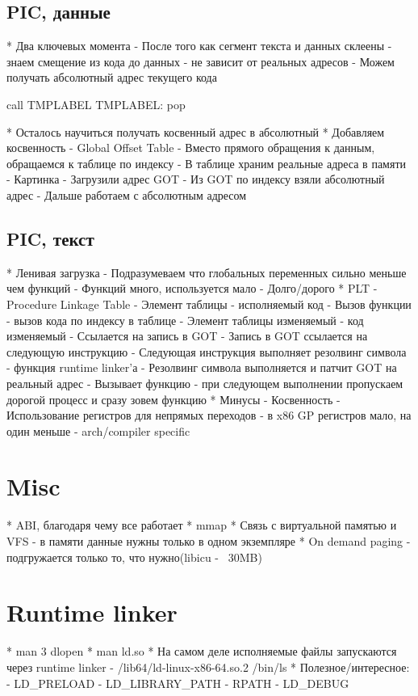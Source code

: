 \documentclass[../../lectures.tex]{subfiles}
\begin{document}
\subsection{PIC, данные}
  * Два ключевых момента
    - После того как сегмент текста и данных склеены - знаем смещение из кода до данных - не зависит от реальных адресов
    - Можем получать абсолютный адрес текущего кода

    call TMPLABEL
    TMPLABEL:
      pop %

  * Осталось научиться получать косвенный адрес в абсолютный
  * Добавляем косвенность - Global Offset Table
    - Вместо прямого обращения к данным, обращаемся к таблице по индексу
    - В таблице храним реальные адреса в памяти
    - Картинка
    - Загрузили адрес GOT
    - Из GOT по индексу взяли абсолютный адрес
    - Дальше работаем с абсолютным адресом

\subsection{PIC, текст}
  * Ленивая загрузка
    - Подразумеваем что глобальных переменных сильно меньше чем функций
    - Функций много, используется мало
    - Долго/дорого
  * PLT - Procedure Linkage Table
    - Элемент таблицы - исполняемый код
    - Вызов функции - вызов кода по индексу в таблице
    - Элемент таблицы изменяемый - код изменяемый
    - Ссылается на запись в GOT
    - Запись в GOT ссылается на следующую инструкцию
    - Следующая инструкция выполняет резолвинг символа - функция runtime linker'а
    - Резолвинг символа выполняется и патчит GOT на реальный адрес
    - Вызывает функцию - при следующем выполнении пропускаем дорогой процесс и сразу зовем функцию
  * Минусы
    - Косвенность
    - Использование регистров для непрямых переходов - в x86 GP регистров мало, на один меньше
    - arch/compiler specific


\section{Misc}
  * ABI, благодаря чему все работает
  * mmap
  * Связь с виртуальной памятью и VFS - в памяти данные нужны только в одном экземпляре
  * On demand paging - подгружается только то, что нужно(libicu - ~30MB)

\section{Runtime linker}
  * man 3 dlopen
  * man ld.so
  * На самом деле исполняемые файлы запускаются через runtime linker - /lib64/ld-linux-x86-64.so.2 /bin/ls
  * Полезное/интересное:
    - LD\_PRELOAD
    - LD\_LIBRARY\_PATH
    - RPATH
    - LD\_DEBUG
\end{document}
